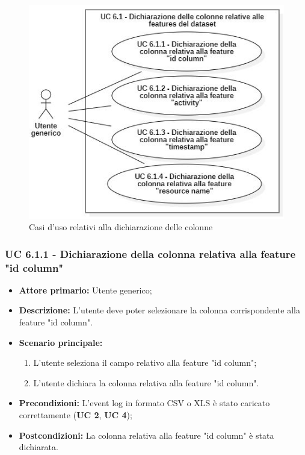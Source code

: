\begin{figure}[H]
    \centering
    \includegraphics[scale=0.6]{immagini/usecase/cd5.JPG}
    \caption{Casi d'uso relativi alla dichiarazione delle colonne}
\end{figure}

\subsubsection{UC 6.1.1 - Dichiarazione della colonna relativa alla feature "id column"}
\begin{itemize}
	\item \textbf{Attore primario:} Utente generico;
	\item \textbf{Descrizione:} L'utente deve poter selezionare la colonna corrispondente alla feature "id column".
	\item \textbf{Scenario principale:} 
		\begin{enumerate}
			\item L'utente seleziona il campo relativo alla feature "id column";
			\item L'utente dichiara la colonna relativa alla feature "id column".
		\end{enumerate}
	\item \textbf{Precondizioni:} L'event log in formato CSV o XLS è stato caricato correttamente (\textbf{UC 2}, \textbf{UC 4});
	\item \textbf{Postcondizioni:} La colonna relativa alla feature "id column" è stata dichiarata.
\end{itemize}


